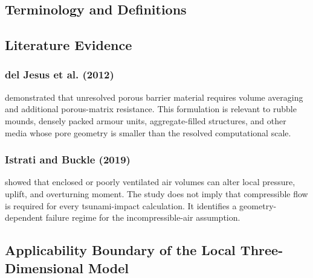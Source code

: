 \subsection{Terminology and Definitions}
\label{sec:res-mod-asm-definitions}


\subsection{Literature Evidence}
\label{sec:res-mod-asm-literature-evidence}

%

\subsubsection{del Jesus et al. (2012)}
\label{sec:res-mod-asm-evidence-deljesus-2012}

\textcite{deljesus2012porous} demonstrated that unresolved porous
barrier material requires volume averaging and additional
porous-matrix resistance. This formulation is relevant to rubble
mounds, densely packed armour units, aggregate-filled structures, and
other media whose pore geometry is smaller than the resolved
computational scale.

\subsubsection{Istrati and Buckle (2019)}
\label{sec:res-mod-asm-evidence-istrati-2019}

\textcite{istrati2019trappedair} showed that enclosed or poorly
ventilated air volumes can alter local pressure, uplift, and
overturning moment. The study does not imply that compressible flow is
required for every tsunami-impact calculation. It identifies a
geometry-dependent failure regime for the incompressible-air
assumption.

\subsection{Applicability Boundary of the Local Three-Dimensional Model}
\label{sec:res-mod-asm-local-applicability}

